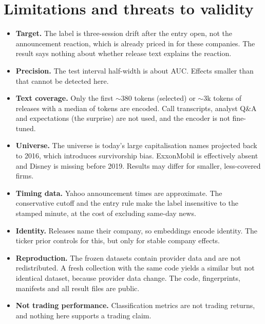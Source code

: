 \documentclass[11pt]{article}
\begin{document}
\section{Limitations and threats to validity}
\begin{itemize}
  \item \textbf{Target.} The label is three-session drift after the entry open, not the announcement
  reaction, which is already priced in for these companies. The result says nothing about whether
  release text explains the reaction.
  \item \textbf{Precision.} The test interval half-width is about \halfWidthHead{} AUC. Effects smaller
  than that cannot be detected here.
  \item \textbf{Text coverage.} Only the first ${\sim}380$ tokens (selected) or ${\sim}3$k tokens of
  releases with a median of \tokMedian{} tokens are encoded. Call transcripts, analyst Q\&A and
  expectations (the surprise) are not used, and the encoder is not fine-tuned.
  \item \textbf{Universe.} The universe is today's large capitalisation names projected back to 2016,
  which introduces survivorship bias. ExxonMobil is effectively absent and Disney is missing before
  2019. Results may differ for smaller, less-covered firms.
  \item \textbf{Timing data.} Yahoo announcement times are approximate. The conservative cutoff and the
  entry rule make the label insensitive to the stamped minute, at the cost of excluding same-day news.
  \item \textbf{Identity.} Releases name their company, so embeddings encode identity. The ticker prior
  controls for this, but only for stable company effects.
  \item \textbf{Reproduction.} The frozen datasets contain provider data and are not redistributed. A
  fresh collection with the same code yields a similar but not identical dataset, because provider data
  change. The code, fingerprints, manifests and all result files are public.
  \item \textbf{Not trading performance.} Classification metrics are not trading returns, and nothing
  here supports a trading claim.
\end{itemize}
\end{document}
